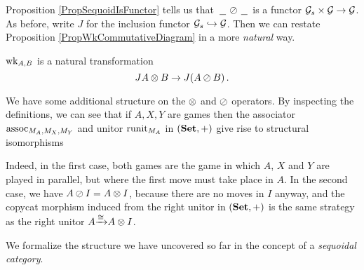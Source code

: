 Proposition \ref{PropSequoidIsFunctor} tells us that $\,\underline{\hspace{1.5ex}}\,\oslash\,\underline{\hspace{1.5ex}}\,$ is a functor $\mathcal G_s\times\mathcal G\to \mathcal G$.  
As before, write $J$ for the inclusion functor $\mathcal G_s\hookrightarrow\mathcal G$.
Then we can restate Proposition \ref{PropWkCommutativeDiagram} in a more \emph{natural} way.

\begin{proposition}
  $\operatorname{wk}_{A,B}$ is a natural transformation
  \[
    JA \otimes B \to J(A \oslash B)\,.
    \]
  \label{PropWkNatural}
\end{proposition}

We have some additional structure on the $\otimes$ and $\oslash$ operators.  
By inspecting the definitions, we can see that if $A,X,Y$ are games then the associator $\operatorname{assoc}_{M_A,M_X,M_Y}$ and unitor $\operatorname{runit}_{M_A}$ in $({\normalfont\textbf{Set}},+)$ give rise to structural isomorphisms
Indeed, in the first case, both games are the game in which $A$, $X$ and $Y$ are played in parallel, but where the first move must take place in $A$.  
In the second case, we have $A\oslash I=A\otimes I$, because there are no moves in $I$ anyway, and the copycat morphism induced from the right unitor in $({\normalfont\textbf{Set}},+)$ is the same strategy as the right unitor $A {\xrightarrow{\cong}} A \otimes I$.

We formalize the structure we have uncovered so far in the concept of a \emph{sequoidal category}.

